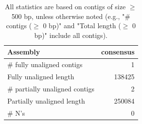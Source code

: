 \documentclass[12pt,a4paper]{article}
\begin{document}
\begin{table}[ht]
\begin{center}
\caption{All statistics are based on contigs of size $\geq$ 500 bp, unless otherwise noted (e.g., "\# contigs ($\geq$ 0 bp)" and "Total length ($\geq$ 0 bp)" include all contigs).}
\begin{tabular}{|l*{1}{|r}|}
\hline
Assembly & consensus \\ \hline
\# fully unaligned contigs & 1 \\ \hline
Fully unaligned length & 138425 \\ \hline
\# partially unaligned contigs & 2 \\ \hline
Partially unaligned length & 250084 \\ \hline
\# N's & 0 \\ \hline
\end{tabular}
\end{center}
\end{table}
\end{document}
